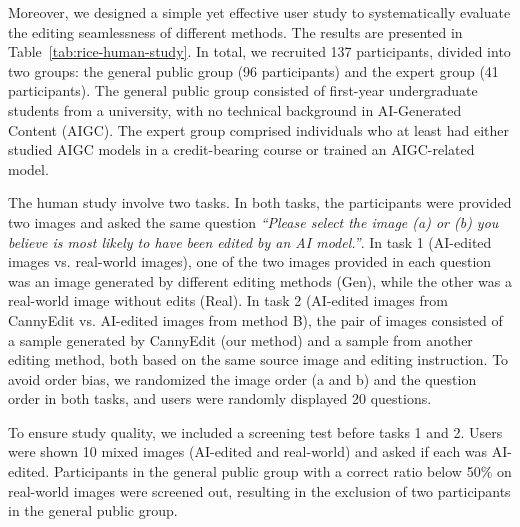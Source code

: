 \documentclass{article}
\begin{document}

Moreover, we designed a simple yet effective user study to systematically evaluate the editing seamlessness of different methods. The results are presented in Table~\ref{tab:rice-human-study}. In total, we recruited 137 participants, divided into two groups: the general public group (96 participants) and the expert group (41 participants). The general public group consisted of first-year undergraduate students from a university, with no technical background in AI-Generated Content (AIGC). The expert group comprised individuals who at least had either studied AIGC models in a credit-bearing course or trained an AIGC-related model.

The human study involve two tasks. In both tasks, the participants were provided two images and asked the same question \emph{``Please select the image (a) or (b) you believe is most likely to have been edited by an AI model.''}. In task 1 (AI-edited images vs. real-world images), one of the two images provided in each question was an image generated by different editing methods (Gen), while the other was a real-world image without edits (Real).  In task 2 (AI-edited images from CannyEdit vs. AI-edited images from method B), the pair of images consisted of a sample generated by CannyEdit (our method) and a sample from another editing method, both based on the same source image and editing instruction. To avoid order bias, we randomized the image order (a and b) and the question order in both tasks, and users were randomly displayed 20 questions.

To ensure study quality, we included a screening test before tasks 1 and 2. Users were shown 10 mixed images (AI-edited and real-world) and asked if each was AI-edited. Participants in the general public group with a correct ratio below 50\% on real-world images were screened out, resulting in the exclusion of two participants in the general public group.
\end{document}

